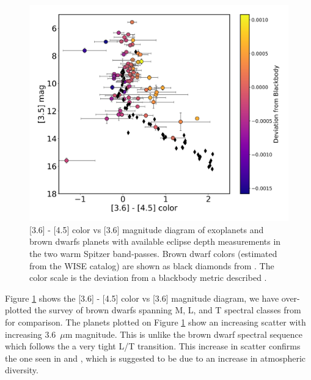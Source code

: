 \begin{figure}
    \centering
    \includegraphics[width = \linewidth]{color+bd+emily.pdf}
    \caption{[3.6] - [4.5] color vs [3.6] magnitude diagram of exoplanets and brown dwarfs planets with available eclipse depth measurements in the two warm Spitzer band-passes. Brown dwarf colors (estimated from the WISE catalog) are shown as black diamonds from \citet{Dupuy2012}. The color scale is the deviation from a blackbody metric described \citet{Baxter2020}.}
    \label{P1:fig:colourmag}
\end{figure}

Figure \ref{P1:fig:colourmag} shows the [3.6] - [4.5] color vs [3.6] magnitude diagram, we have over-plotted the survey of brown dwarfs spanning M, L, and T spectral classes from \citet{Dupuy2012} for comparison. The planets plotted on Figure \ref{P1:fig:colourmag} show an increasing scatter with increasing 3.6~$\mu$m magnitude. This is unlike the brown dwarf spectral sequence which follows the a very tight L/T transition. This increase in scatter confirms the one seen in \citet{Triaud2014a, Beatty2014, Melville2020} and \citet{Dransfield2020}, which is suggested to be due to an increase in atmospheric diversity.

